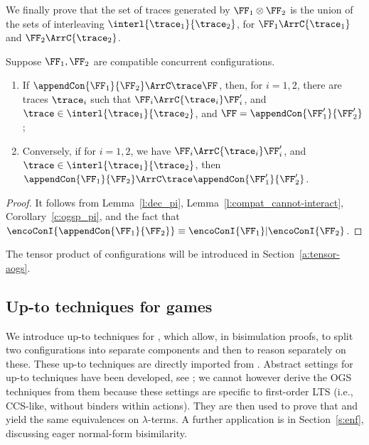 \noindent
We finally prove that the set of traces generated by $\FF_1 \otimes \FF_2$
is the  union of the sets of interleaving $\interl{\trace_1}{\trace_2}$,
for $\FF_1 \ArrC{\trace_1}$ and $\FF_2 \ArrC{\trace_2}$.
\begin{lemma}
\label{l:COGS-interleave-tensor}
\iflong
Suppose $\FF_1,\FF_2$ are compatible concurrent configurations.
\begin{enumerate}
\item\label{l:COGS-interleave-tensor_1}
If $\appendCon
 {\FF_1} {\FF_2} \ArrC \trace  \FF  $, then, 
for $i=1,2$,  there are traces $ \trace_i $
such that $ {\FF_i} \ArrC { \trace_i} \FF'_i $, and $ \trace  
\in   \interl { \trace_1   }{ \trace_2 }$, and 
$\FF = \appendCon
 {\FF'_1} {\FF'_2}$;
\item\label{l:COGS-interleave-tensor_2}
Conversely,
if for  $i=1,2$, we have
 $ {\FF_i} \ArrC { \trace_i} \FF'_i$,
and
$ \trace  
\in   \interl { \trace_1   }{ \trace_2 }$, 
then 
$ 
\appendCon
{\FF_1} {\FF_2} \ArrC \trace   \appendCon
 {\FF'_1} {\FF'_2}$.
\end{enumerate}
\fi
\end{lemma}  

\begin{proof}
  It follows from Lemma~\ref{l:dec_pi}, 
  Lemma~\ref{l:compat_cannot-interact},
  Corollary~\ref{c:ogsp_pi}, and the fact that
  $\encoConI {
  \appendCon
  {\FF_1} {\FF_2}}
  \equiv 
  \encoConI {
  \FF_1}
  |
  \encoConI {
  {\FF_2}}$.
\end{proof}

\noindent
The tensor product of \AOGS configurations will be introduced
in Section~\ref{a:tensor-aogs}.



\subsection{Up-to techniques for games}
\label{ss:upto_games}

We introduce up-to techniques for \COGS, which allow, in bisimulation proofs, 
to split two \COGS configurations  
into separate components and then to reason separately on these.
These up-to techniques are directly imported from \piI.
Abstract settings for up-to techniques have been developed, see
\cite{SanPous,PousS19}; we cannot however derive the OGS techniques from
them because these settings are specific to first-order LTS (i.e., CCS-like, 
without binders within actions). 
%
They are then used to prove that
\COGS and \AOGS yield the same equivalences on
$\lambda$-terms.
A further application is in Section~\ref{s:enf}, 
discussing eager normal-form bisimilarity. 


